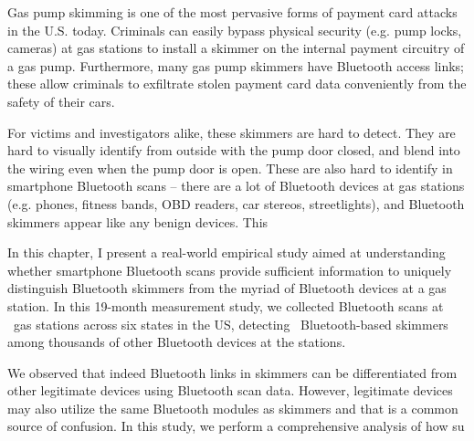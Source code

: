 
Gas pump skimming is one of the most pervasive forms of payment card attacks in
	the U.S. today.
%
Criminals can easily bypass physical security (e.g. pump locks, cameras) at gas stations to install a skimmer on the internal payment circuitry of a gas pump.
%
Furthermore, many gas pump skimmers have Bluetooth access links; these allow criminals to exfiltrate stolen payment card data conveniently from the safety of their cars. 
%

For victims and investigators alike, these skimmers are hard to detect. 
%
They are hard to visually identify from outside with the pump door closed, and blend into the wiring even when the pump door is open.
%
These are also hard to identify in smartphone Bluetooth scans -- there are a lot of Bluetooth devices at gas stations (e.g. phones, fitness bands, OBD readers, car stereos, streetlights), and Bluetooth skimmers appear like any benign devices.
%
This
%
%
% 

In this chapter, I present a real-world empirical study aimed at understanding whether smartphone Bluetooth scans provide sufficient information to uniquely distinguish Bluetooth skimmers from the myriad of Bluetooth devices at a gas station.
%
In this 19-month measurement study, we collected Bluetooth scans at \visitedgasstations~gas stations across six states in the US, detecting \totalskimmers~Bluetooth-based skimmers among thousands of other Bluetooth devices at the stations. 
%

We observed that indeed Bluetooth links in skimmers can be differentiated from other legitimate devices using Bluetooth scan data.
%
However, legitimate devices may also utilize the same Bluetooth modules as skimmers and that is a common source of confusion.
%
In this study, we perform a comprehensive analysis of how su


